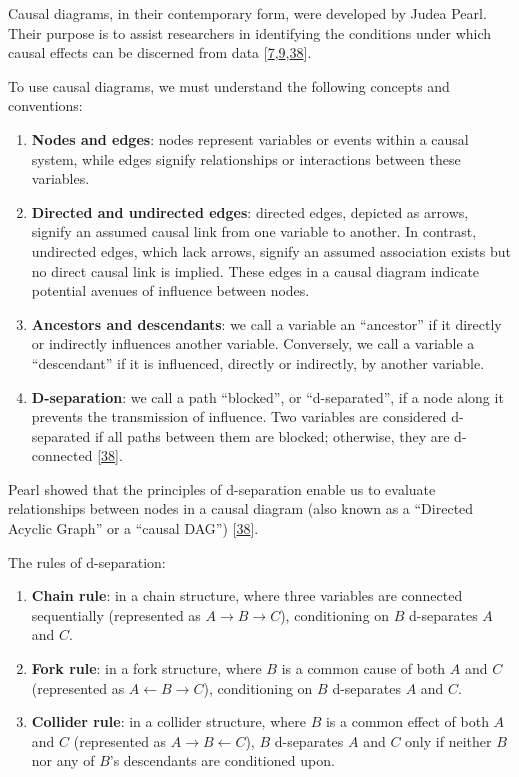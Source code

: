 \documentclass[
  singlecolumn]{article}
\begin{document}
Causal diagrams, in their contemporary form, were developed by Judea
Pearl. Their purpose is to assist researchers in identifying the
conditions under which causal effects can be discerned from data
{[}\protect\hyperlink{ref-greenland1999}{7},\protect\hyperlink{ref-pearl2009}{9},\protect\hyperlink{ref-pearl1995}{38}{]}.

To use causal diagrams, we must understand the following concepts and
conventions:

\begin{enumerate}
\def\labelenumi{\arabic{enumi}.}
\item
  \textbf{Nodes and edges}: nodes represent variables or events within a
  causal system, while edges signify relationships or interactions
  between these variables.
\item
  \textbf{Directed and undirected edges}: directed edges, depicted as
  arrows, signify an assumed causal link from one variable to another.
  In contrast, undirected edges, which lack arrows, signify an assumed
  association exists but no direct causal link is implied. These edges
  in a causal diagram indicate potential avenues of influence between
  nodes.
\item
  \textbf{Ancestors and descendants}: we call a variable an ``ancestor''
  if it directly or indirectly influences another variable. Conversely,
  we call a variable a ``descendant'' if it is influenced, directly or
  indirectly, by another variable.
\item
  \textbf{D-separation}: we call a path ``blocked'', or ``d-separated'',
  if a node along it prevents the transmission of influence. Two
  variables are considered d-separated if all paths between them are
  blocked; otherwise, they are d-connected
  {[}\protect\hyperlink{ref-pearl1995}{38}{]}.
\end{enumerate}

Pearl showed that the principles of d-separation enable us to evaluate
relationships between nodes in a causal diagram (also known as a
``Directed Acyclic Graph'' or a ``causal DAG'')
{[}\protect\hyperlink{ref-pearl1995}{38}{]}.

The rules of d-separation:

\begin{enumerate}
\def\labelenumi{\alph{enumi}.}
\item
  \textbf{Chain rule}: in a chain structure, where three variables are
  connected sequentially (represented as
  \(A \rightarrow B \rightarrow C\)), conditioning on \(B\) d-separates
  \(A\) and \(C\).
\item
  \textbf{Fork rule}: in a fork structure, where \(B\) is a common cause
  of both \(A\) and \(C\) (represented as
  \(A \leftarrow B \rightarrow C\)), conditioning on \(B\) d-separates
  \(A\) and \(C\).
\item
  \textbf{Collider rule}: in a collider structure, where \(B\) is a
  common effect of both \(A\) and \(C\) (represented as
  \(A \rightarrow B \leftarrow C\)), \(B\) d-separates \(A\) and \(C\)
  only if neither \(B\) nor any of \(B\)'s descendants are conditioned
  upon.
\end{enumerate}
\end{document}
